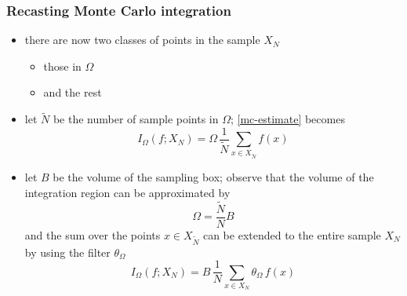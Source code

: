 \begin{frame}[fragile]
%
  \frametitle{Recasting Monte Carlo integration}
%
  \begin{itemize}
%
  \item there are now two classes of points in the sample $X_{N}$ 
    \begin{itemize}
    \item those in $\Omega$
    \item and the rest
    \end{itemize}
%
  \item let $\tilde{N}$ be the number of sample points in $\Omega$; \eqref{mc-estimate} becomes
    \begin{equation}
      I_{\Omega} (f; X_{N})
      =
      \Omega \, \frac{1}{\tilde{N}} \sum_{x \in X_{\tilde{N}}} f(x)
      \label{eq:mc-box}
    \end{equation}
%
  \item let $B$ be the volume of the sampling box; observe that the volume of the integration
    region can be approximated by
    \begin{equation}
      \Omega = \frac{\tilde{N}}{N} B
    \end{equation}
%
    and the sum over the points $x \in X_{\tilde{N}}$ can be extended to the entire sample
    $X_{N}$ by using the filter $\theta_{\Omega}$
%
    \begin{equation}
      I_{\Omega} (f; X_{N})
      =
      B \, \frac{1}{N} \sum_{x \in X_{N}} \theta_{\Omega} \, f(x)
    \end{equation}
%
  \end{itemize}
%
\end{frame}


